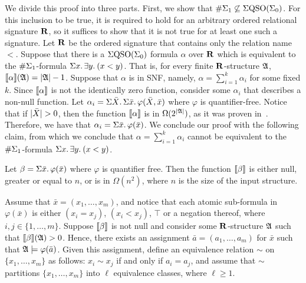 
We divide this proof into three parts.
First, we show that $\#\Sigma_{1} \not\subseteq \Sigma{\rm QSO}(\Sigma_{0})$. 
For this inclusion to be true, it is required to hold for an arbitrary ordered relational signature $\mathbf{R}$, so it suffices to show that it  is not true for at least one such a signature.
Let $\mathbf{R}$ be the ordered signature that contains only the relation name $<$.
Suppose that there is a $\Sigma{\rm QSO}(\Sigma_{0})$ formula $\alpha$ over $\mathbf{R}$ which is equivalent to the $\#\Sigma_{1}$-formula $\Sigma{x}.\, \exists{y}.\: (x < y)$. 
That is, for every finite $\mathbf{R}$-structure $\mathfrak{A}$, ${\llbracket{}{\alpha}\rrbracket}(\mathfrak{A}) = \vert \mathfrak{A} \vert - 1$.
Suppose that $\alpha$ is in SNF, namely, $\alpha = \sum_{i = 1}^k \alpha_i$ for some fixed $k$. 
Since ${\llbracket{}{\alpha}\rrbracket}$ is not the identically zero function, consider some $\alpha_i$ that describes a non-null function. 
Let $\alpha_i = \Sigma{\bar{X}}.\,\Sigma{\bar{x}}.\,\varphi(\bar{X},\bar{x})$ where $\varphi$ is quantifier-free. 
Notice that if $\vert \bar{X} \vert > 0$, then the function ${\llbracket{}{\alpha}\rrbracket}$ is in $\Omega(2^{\vert \mathfrak{A} \vert})$, as it was proven in~\cite{SalujaST95}. 
Therefore, we have that $\alpha_i = \Sigma{\bar{x}}.\,\varphi(\bar{x})$. 
We conclude our proof with the following claim, from which we conclude that $\alpha = \sum_{i = 1}^k \alpha_i$ cannot be equivalent to the $\#\Sigma_{1}$-formula $\Sigma{x}.\, \exists{y}.\: (x < y)$. 
\begin{clm}
	Let $\beta = \Sigma{\bar{x}}.\,\varphi(\bar{x})$	where $\varphi$ is quantifier free. 
	Then the function ${\llbracket{}{\beta}\rrbracket}$ is either null, greater or equal to $n$, or is in $\Omega(n^2)$, where $n$ is the size of the input structure.
\end{clm}
\proof
Assume that $\bar x = (x_1, \ldots, x_m)$, and notice that each atomic sub-formula in $\varphi(\bar{x})$ is either $(x_i = x_j)$, $(x_i < x_j)$, $\top$ or a negation thereof, where $i,j \in \{1, \ldots, m\}$. 
	Suppose ${\llbracket{}{\beta}\rrbracket}$ is not null and consider some $\mathbf{R}$-structure $\mathfrak{A}$ such that ${\llbracket{}{\beta}\rrbracket}(\mathfrak{A}) > 0$. Hence, there exists an assignment $\bar a = (a_1, \ldots, a_m)$
	for $\bar{x}$ such that $\mathfrak{A}\models\varphi(\bar{a})$.
	Given this assignment, define an equivalence relation $\sim$ on $\{x_1, \ldots, x_m\}$ as follows: $x_i \sim x_j$ if and only if $a_i = a_j$, and assume that $\sim$ partitions $\{x_1, \ldots, x_m\}$ into $\ell$ equivalence classes, where $\ell \geq 1$.
